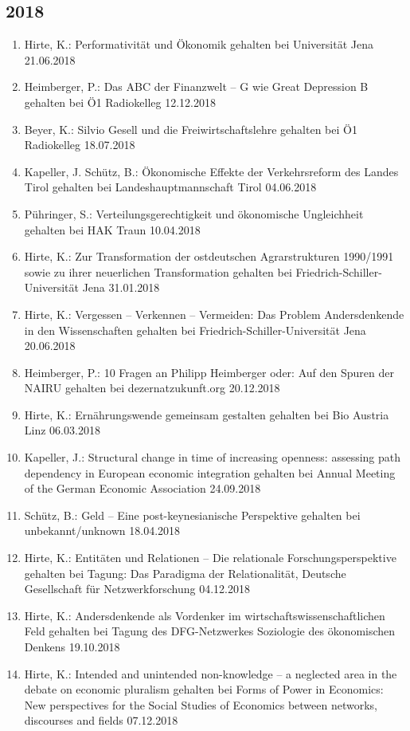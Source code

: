 \subsection*{2018}
\begin{enumerate}
	\item Hirte, K.: Performativität und Ökonomik gehalten bei Universität Jena 21.06.2018
	\item Heimberger, P.: Das ABC der Finanzwelt -- G wie Great Depression B gehalten bei Ö1 Radiokelleg 12.12.2018
	\item Beyer, K.: Silvio Gesell und die Freiwirtschaftslehre gehalten bei Ö1 Radiokelleg 18.07.2018
	\item Kapeller, J. Schütz, B.: Ökonomische Effekte der Verkehrsreform des Landes Tirol gehalten bei Landeshauptmannschaft Tirol 04.06.2018
	\item Pühringer, S.: Verteilungsgerechtigkeit und ökonomische Ungleichheit gehalten bei HAK Traun 10.04.2018
	\item Hirte, K.: Zur Transformation der ostdeutschen Agrarstrukturen 1990/1991 sowie zu ihrer neuerlichen Transformation gehalten bei Friedrich-Schiller-Universität Jena 31.01.2018
	\item Hirte, K.: Vergessen – Verkennen – Vermeiden: Das Problem Andersdenkende in den Wissenschaften gehalten bei Friedrich-Schiller-Universität Jena 20.06.2018
	\item Heimberger, P.: 10 Fragen an Philipp Heimberger oder: Auf den Spuren der NAIRU gehalten bei dezernatzukunft.org 20.12.2018
	\item Hirte, K.: Ernährungswende gemeinsam gestalten gehalten bei Bio Austria Linz 06.03.2018
	\item Kapeller, J.: Structural change in time of increasing openness: assessing path dependency in European economic integration gehalten bei Annual Meeting of the German Economic Association 24.09.2018
	\item Schütz, B.: Geld -- Eine post-keynesianische Perspektive gehalten bei unbekannt/unknown 18.04.2018
	\item Hirte, K.: Entitäten und Relationen – Die relationale Forschungsperspektive gehalten bei Tagung: Das Paradigma der Relationalität, Deutsche Gesellschaft für Netzwerkforschung 04.12.2018
	\item Hirte, K.: Andersdenkende als Vordenker im wirtschaftswissenschaftlichen Feld gehalten bei Tagung des DFG-Netzwerkes \glqq Soziologie des ökonomischen Denkens\grqq{} 19.10.2018
	\item Hirte, K.: Intended and unintended non-knowledge – a neglected area in the debate on economic pluralism gehalten bei Forms of Power in Economics: New perspectives for the Social Studies of Economics between networks, discourses and fields 07.12.2018

\end{enumerate}
